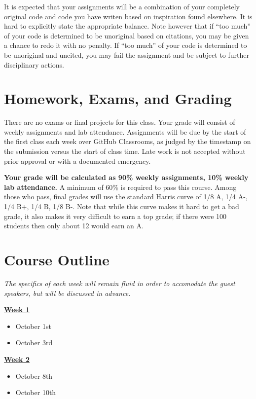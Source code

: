 \documentclass{article}
\begin{document}
It is expected that your assignments will be a combination of your completely original code and code you have writen based on inspiration found elsewhere.  It is hard to explicitly state the appropriate balance.  Note however that if ``too much'' of your code is determined to be unoriginal based on citations, you may be given a chance to redo it with no penalty.  If ``too much'' of your code is determined to be unoriginal and uncited, you may fail the assignment and be subject to further disciplinary actions.

\section*{Homework, Exams, and Grading}
There are no exams or final projects for this class.  Your grade will consist of weekly assignments and lab attendance.  Assignments will be due by the start of the first class each week over GitHub Classrooms, as judged by the timestamp on the submission versus the start of class time.  Late work is not accepted without prior approval or with a documented emergency.

\textbf{Your grade will be calculated as 90\% weekly assignments, 10\% weekly lab attendance.}  A minimum of 60\% is required to pass this course.  Among those who pass, final grades will use the standard Harris curve of 1/8 A, 1/4 A-, 1/4 B+, 1/4 B, 1/8 B-.  Note that while this curve makes it hard to get a bad grade, it also makes it very difficult to earn a top grade; if there were 100 students then only about 12 would earn an A.



\section*{Course Outline}

\textit{The specifics of each week will remain fluid in order to accomodate the guest speakers, but will be discussed in advance.}\\
\smallskip

\noindent
\textbf{\underline{Week 1}}
\begin{itemize}
\item October 1st
\item October 3rd
\end{itemize}
\bigskip

\noindent
\textbf{\underline{Week 2}}
\begin{itemize}
\item October 8th
\item October 10th
\end{itemize}
\bigskip
\end{document}

